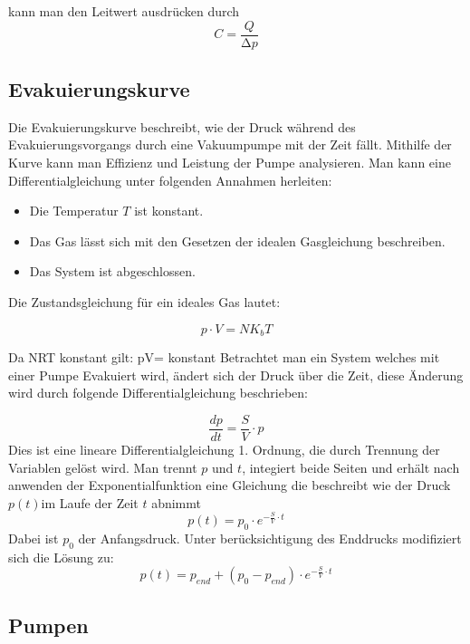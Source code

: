kann man den Leitwert ausdrücken durch
\begin{equation}
    C=\frac{Q}{\increment p}
\end{equation} 


\subsection{Evakuierungskurve}
Die Evakuierungskurve beschreibt, wie der Druck während des Evakuierungsvorgangs durch eine Vakuumpumpe 
mit der Zeit fällt. Mithilfe der Kurve kann man Effizienz und Leistung der Pumpe analysieren.
Man kann eine Differentialgleichung unter folgenden Annahmen herleiten:
\begin{itemize}
\item Die Temperatur \(T \) ist konstant. 
\item Das Gas lässt sich mit den Gesetzen der idealen Gasgleichung beschreiben.
\item Das System ist abgeschlossen.
\end{itemize}

Die Zustandsgleichung für ein ideales Gas lautet:

\begin{equation}
    p \cdot V=NK_bT 
\end{equation}

Da N\cdot R\cdot T konstant gilt:  p\cdot V= konstant
Betrachtet man ein System welches mit einer Pumpe Evakuiert wird, ändert sich der Druck über die Zeit, 
diese Änderung wird durch folgende Differentialgleichung beschrieben:

\begin{equation}
    \frac{dp}{dt}=\frac{S}{V}\cdot p
\end{equation}
Dies ist eine lineare Differentialgleichung 1. Ordnung, die durch Trennung der Variablen gelöst wird.
Man trennt \(p \) und \(t \), integiert beide Seiten und erhält nach anwenden der Exponentialfunktion eine
Gleichung die beschreibt wie der Druck \(p(t)\)im Laufe der Zeit \(t \) abnimmt
\begin{equation}
p(t)=p_0\cdot e^{-\frac{S}{V}\cdot t}
\end{equation}
Dabei ist \(p_0\) der Anfangsdruck. Unter berücksichtigung des Enddrucks modifiziert sich die Lösung zu:
\begin{equation}
    p(t)=p_{end}+(p_0-p_{end})\cdot e^{-\frac{S}{V}\cdot t}
\end{equation}


\subsection{Pumpen}
